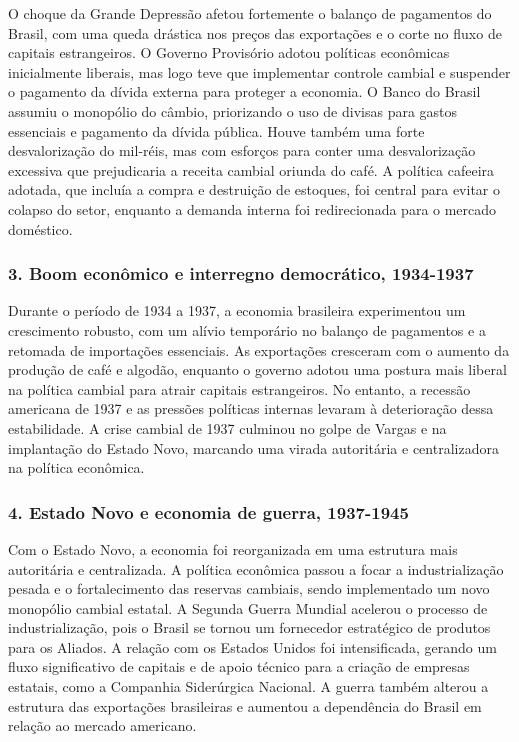 \documentclass[a4paper,12pt]{article}[abntex2]
\begin{document}
O choque da Grande Depressão afetou fortemente o balanço de pagamentos do Brasil, com uma queda drástica nos preços das exportações e o corte no fluxo de capitais estrangeiros. O Governo Provisório adotou políticas econômicas inicialmente liberais, mas logo teve que implementar controle cambial e suspender o pagamento da dívida externa para proteger a economia. O Banco do Brasil assumiu o monopólio do câmbio, priorizando o uso de divisas para gastos essenciais e pagamento da dívida pública. Houve também uma forte desvalorização do mil-réis, mas com esforços para conter uma desvalorização excessiva que prejudicaria a receita cambial oriunda do café. A política cafeeira adotada, que incluía a compra e destruição de estoques, foi central para evitar o colapso do setor, enquanto a demanda interna foi redirecionada para o mercado doméstico.

\subsubsection{\textbf{3. Boom econômico e interregno democrático, 1934-1937}}

Durante o período de 1934 a 1937, a economia brasileira experimentou um crescimento robusto, com um alívio temporário no balanço de pagamentos e a retomada de importações essenciais. As exportações cresceram com o aumento da produção de café e algodão, enquanto o governo adotou uma postura mais liberal na política cambial para atrair capitais estrangeiros. No entanto, a recessão americana de 1937 e as pressões políticas internas levaram à deterioração dessa estabilidade. A crise cambial de 1937 culminou no golpe de Vargas e na implantação do Estado Novo, marcando uma virada autoritária e centralizadora na política econômica.

\subsubsection{\textbf{4. Estado Novo e economia de guerra, 1937-1945}}

Com o Estado Novo, a economia foi reorganizada em uma estrutura mais autoritária e centralizada. A política econômica passou a focar a industrialização pesada e o fortalecimento das reservas cambiais, sendo implementado um novo monopólio cambial estatal. A Segunda Guerra Mundial acelerou o processo de industrialização, pois o Brasil se tornou um fornecedor estratégico de produtos para os Aliados. A relação com os Estados Unidos foi intensificada, gerando um fluxo significativo de capitais e de apoio técnico para a criação de empresas estatais, como a Companhia Siderúrgica Nacional. A guerra também alterou a estrutura das exportações brasileiras e aumentou a dependência do Brasil em relação ao mercado americano.
\end{document}
